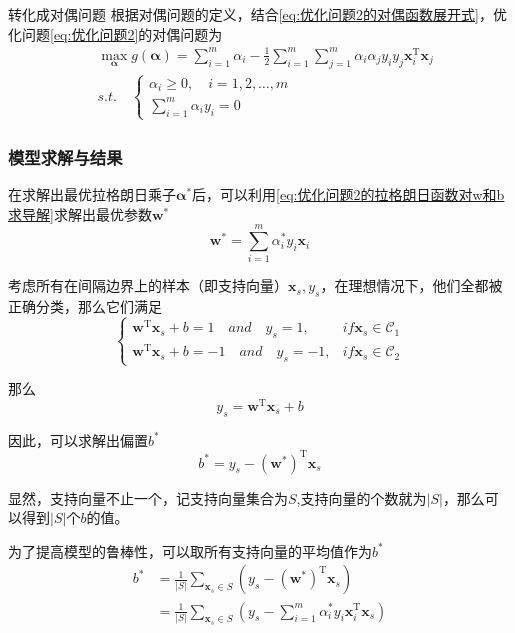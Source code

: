 \documentclass[withoutpreface,bwprint]{NoteBook}
\begin{document}
\begin{criticalSteps}
    {转化成对偶问题}
    {}
根据对偶问题的定义，结合\cref{eq:优化问题2的对偶函数展开式}，优化问题\cref{eq:优化问题2}的对偶问题为
\begin{align}
    \label{eq:优化问题2的对偶问题}
    & \max_{\bm{\alpha}} g(\bm{\alpha}) = \sum_{i=1}^{m} \alpha_i - \frac{1}{2} \sum_{i=1}^{m} \sum_{j=1}^{m} \alpha_i \alpha_j y_i y_j \mathbf{x}_i^\mathrm{T} \mathbf{x}_j \\
    & s.t. \quad \begin{cases}
        \alpha_i \geq 0, \quad i=1,2,\dots,m \\
        \sum_{i=1}^{m} \alpha_i y_i = 0
    \end{cases}
\end{align}

\end{criticalSteps}

\subsubsection{模型求解与结果}
在求解出最优拉格朗日乘子$\bm{\alpha}^*$后，可以利用\cref{eq:优化问题2的拉格朗日函数对w和b求导解}求解出最优参数$\mathbf{w}^*$
\begin{equation}
    \label{eq:线性支持向量机的最优参数w}
    \mathbf{w}^* = \sum_{i=1}^{m} \alpha_i^* y_i \mathbf{x}_i
\end{equation}

考虑所有在间隔边界上的样本（即支持向量）${\mathbf{x}_s, y_s}$，在理想情况下，他们全都被正确分类，那么它们满足
\begin{equation*}
    \begin{cases}
        \mathbf{w}^\mathrm{T} \mathbf{x}_s + b = 1\quad and \quad y_s=1, & if \mathbf{x}_s \in \mathcal{C}_1 \\
        \mathbf{w}^\mathrm{T} \mathbf{x}_s + b = -1 \quad and \quad y_s=-1, & if \mathbf{x}_s \in \mathcal{C}_2
    \end{cases}
\end{equation*}

那么
$$
y_s = \mathbf{w}^\mathrm{T} \mathbf{x}_s + b
$$

因此，可以求解出偏置$b^*$
$$
b^* = y_s - (\mathbf{w}^*)^\mathrm{T} \mathbf{x}_s
$$

显然，支持向量不止一个，记支持向量集合为$S$,支持向量的个数就为$|S|$，那么可以得到$|S|$个$b$的值。

为了提高模型的鲁棒性，可以取所有支持向量的平均值作为$b^*$
\begin{align}
    \label{eq:线性支持向量机的最优参数b}
    b^* &= \frac{1}{ |S| } \sum_{\mathbf{x}_s \in S} (y_s - (\mathbf{w}^*)^\mathrm{T} \mathbf{x}_s) \nonumber \\
        &= \frac{1}{ |S| } \sum_{\mathbf{x}_s \in S} (y_s - \sum_{i=1}^{m} \alpha_i^* y_i \mathbf{x}_i^\mathrm{T} \mathbf{x}_s)
\end{align}
\end{document}

